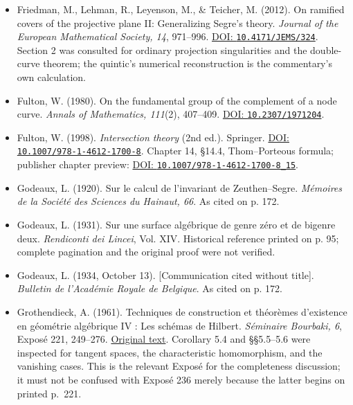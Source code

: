 \begin{sloppypar}
\begin{itemize}
\item Friedman, M., Lehman, R., Leyenson, M., \& Teicher, M. (2012). On ramified covers of the projective plane II: Generalizing Segre's theory. \emph{Journal of the European Mathematical Society, 14}, 971--996. \href{https://doi.org/10.4171/JEMS/324}{DOI: \nolinkurl{10.4171/JEMS/324}}. Section 2 was consulted for ordinary projection singularities and the double-curve theorem; the quintic's numerical reconstruction is the commentary's own calculation.

\item Fulton, W. (1980). On the fundamental group of the complement of a node curve. \emph{Annals of Mathematics, 111}(2), 407--409. \href{https://doi.org/10.2307/1971204}{DOI: \nolinkurl{10.2307/1971204}}.

\item Fulton, W. (1998). \emph{Intersection theory} (2nd ed.). Springer. \href{https://doi.org/10.1007/978-1-4612-1700-8}{DOI: \nolinkurl{10.1007/978-1-4612-1700-8}}. Chapter 14, §14.4, Thom--Porteous formula; publisher chapter preview: \href{https://doi.org/10.1007/978-1-4612-1700-8_15}{DOI: \nolinkurl{10.1007/978-1-4612-1700-8_15}}.

\item Godeaux, L. (1920). Sur le calcul de l'invariant de Zeuthen--Segre. \emph{M\'emoires de la Soci\'et\'e des Sciences du Hainaut, 66}. As cited on p. 172.

\item Godeaux, L. (1931). Sur une surface alg\'ebrique de genre z\'ero et de bigenre deux. \emph{Rendiconti dei Lincei}, Vol. XIV. Historical reference printed on p. 95; complete pagination and the original proof were not verified.

\item Godeaux, L. (1934, October 13). [Communication cited without title]. \emph{Bulletin de l'Acad\'emie Royale de Belgique}. As cited on p. 172.

\item Grothendieck, A. (1961). Techniques de construction et théorèmes d'existence en géométrie algébrique IV : Les schémas de Hilbert. \emph{Séminaire Bourbaki, 6}, Exposé 221, 249--276. \href{https://www.numdam.org/item/SB_1960-1961__6__249_0.pdf}{Original text}. Corollary 5.4 and §§5.5--5.6 were inspected for tangent spaces, the characteristic homomorphism, and the vanishing cases. This is the relevant Exposé for the completeness discussion; it must not be confused with Exposé 236 merely because the latter begins on printed p.~221.


\end{itemize}
\end{sloppypar}
